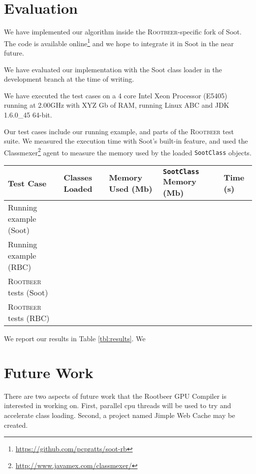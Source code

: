 \documentclass[preprint]{sigplanconf}
\begin{document}
\section{Evaluation}
\label{sec:eval}

We have implemented our algorithm inside the \textsc{Rootbeer}-specific fork of Soot. The code is available online\footnote{\url{https://github.com/pcpratts/soot-rb}} and we hope to integrate it in Soot in the near future.

We have evaluated our implementation with the Soot class loader in the development branch at the time of writing.

We have executed the test cases on a 4 core Intel Xeon Processor (E5405) running at 2.00GHz with XYZ Gb of RAM, running Linux ABC and JDK 1.6.0\_45 64-bit. 

Our test cases include our running example, and parts of the \textsc{Rootbeer} test suite. We measured the execution time with Soot's built-in feature, and used the Classmexer\footnote{\url{http://www.javamex.com/classmexer/}} agent to measure the memory used by the loaded {\tt SootClass} objects.



\begin{table*}[!h]
\begin{tabularx}{\textwidth}{|l|l|X|X|l|}
\hline
\textbf{Test Case} & \textbf{Classes Loaded} & \textbf{Memory Used (Mb)} & \textbf{\texttt{SootClass} Memory (Mb)}& \textbf{Time (s)} \\\hline
Running example (Soot) & &&  &  \\\hline
Running example (RBC) &  &&  &  \\\hline
\textsc{Rootbeer} tests (Soot) && & & \\\hline
\textsc{Rootbeer} tests (RBC) && & & \\\hline
\end{tabularx}
\caption{Experimental results}
\label{tbl:results}
\end{table*}

We report our results in Table \ref{tbl:results}. We 

\section{Future Work}
\label{sec:future}
There are two aspects of future work that the Rootbeer GPU Compiler is interested in working on. First, parallel cpu threads will be used to try and accelerate class loading. Second, a project named Jimple Web Cache may be created.
\end{document}
